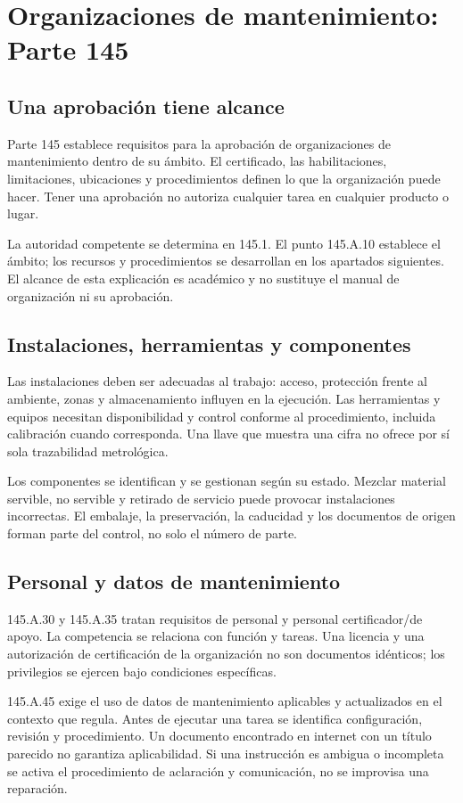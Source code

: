 \chapter{Organizaciones de mantenimiento: Parte 145}\label{ch:18}
\section{Una aprobación tiene alcance}
Parte 145 establece requisitos para la aprobación de organizaciones de mantenimiento dentro de su ámbito. El certificado, las habilitaciones, limitaciones, ubicaciones y procedimientos definen lo que la organización puede hacer. Tener una aprobación no autoriza cualquier tarea en cualquier producto o lugar.

La autoridad competente se determina en 145.1. El punto 145.A.10 establece el ámbito; los recursos y procedimientos se desarrollan en los apartados siguientes. El alcance de esta explicación es académico y no sustituye el manual de organización ni su aprobación.
\section{Instalaciones, herramientas y componentes}
Las instalaciones deben ser adecuadas al trabajo: acceso, protección frente al ambiente, zonas y almacenamiento influyen en la ejecución. Las herramientas y equipos necesitan disponibilidad y control conforme al procedimiento, incluida calibración cuando corresponda. Una llave que muestra una cifra no ofrece por sí sola trazabilidad metrológica.

Los componentes se identifican y se gestionan según su estado. Mezclar material servible, no servible y retirado de servicio puede provocar instalaciones incorrectas. El embalaje, la preservación, la caducidad y los documentos de origen forman parte del control, no solo el número de parte.
\section{Personal y datos de mantenimiento}
145.A.30 y 145.A.35 tratan requisitos de personal y personal certificador/de apoyo. La competencia se relaciona con función y tareas. Una licencia y una autorización de certificación de la organización no son documentos idénticos; los privilegios se ejercen bajo condiciones específicas.

145.A.45 exige el uso de datos de mantenimiento aplicables y actualizados en el contexto que regula. Antes de ejecutar una tarea se identifica configuración, revisión y procedimiento. Un documento encontrado en internet con un título parecido no garantiza aplicabilidad. Si una instrucción es ambigua o incompleta se activa el procedimiento de aclaración y comunicación, no se improvisa una reparación.
